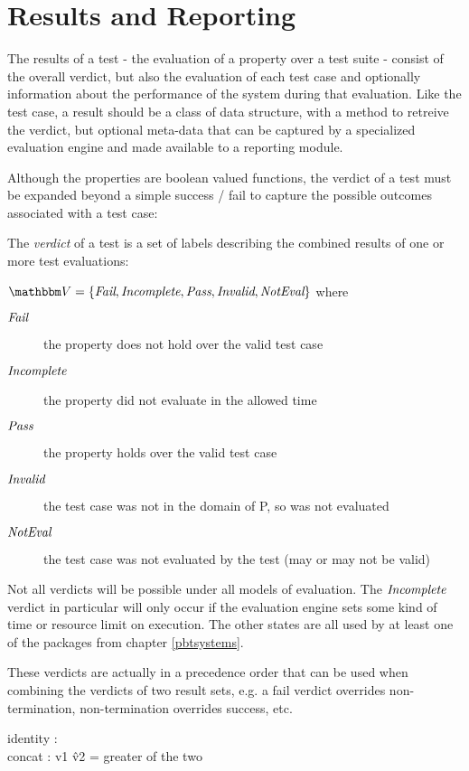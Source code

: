 \section{Results and Reporting}
The results of a test - the evaluation of a property over a test suite - consist of the overall verdict,
but also the evaluation of each test case 
and optionally information about the performance of the system during that evaluation.
Like the test case,
a result should be a class of data structure,
with a method to retreive the verdict,
but optional meta-data that can be captured by a specialized evaluation engine
and made available to a reporting module.

Although the properties are boolean valued functions,
the verdict of a test must be expanded beyond a simple success / fail
to capture the possible outcomes associated with a test case:

\begin{df}[Verdicts]
The \emph{verdict} of a test is a set of labels describing the combined results of one or more test evaluations:

 $\verdictset = \{ \fail, \nonterm, \success, \invalid, \noteval \}$ where

\begin{description}
\item[$\emph{Fail}$] the property does not hold over the valid test case
\item[$\emph{Incomplete}$] the property did not evaluate in the allowed time
\item[$\emph{Pass}$] the property holds over the valid test case
\item[$\emph{Invalid}$] the test case was not in the domain of P, so was not evaluated
\item[$\emph{NotEval}$] the test case was not evaluated by the test (may or may not be valid)
\end{description}
\end{df}

Not all verdicts will be possible under all models of evaluation.
The $\emph{Incomplete}$ verdict in particular will only occur if the evaluation engine 
sets some kind of time or resource limit on execution.
The other states are all used by at least one of the packages from chapter \ref{pbtsystems}.

These verdicts are actually in a precedence order that can be used when combining 
the verdicts of two result sets,
e.g. a fail verdict overrides non-termination, non-termination overrides success, etc.
\begin{df}
identity : \noteval \\
concat : v1 \^ v2 = greater of the two\\
\end{df}

